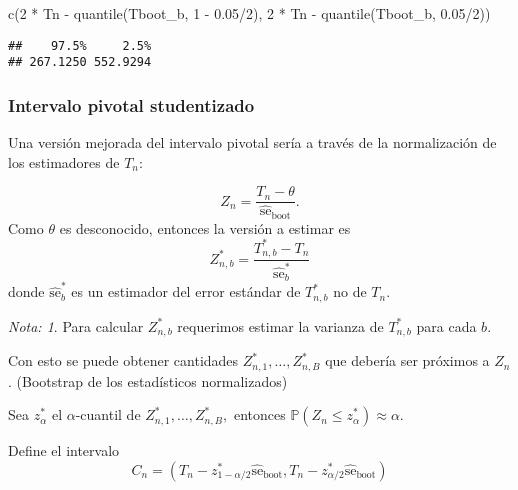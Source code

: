 \documentclass[
  12pt,
]{book}
\newenvironment{Shaded}{\begin{snugshade}}{\end{snugshade}}
\newcommand{\DecValTok}[1]{\textcolor[rgb]{0.00,0.00,0.81}{#1}}
\newcommand{\FloatTok}[1]{\textcolor[rgb]{0.00,0.00,0.81}{#1}}
\newcommand{\FunctionTok}[1]{\textcolor[rgb]{0.00,0.00,0.00}{#1}}
\newcommand{\NormalTok}[1]{#1}
\newcommand{\SpecialCharTok}[1]{\textcolor[rgb]{0.00,0.00,0.00}{#1}}
\theoremstyle{definition}
\theoremstyle{definition}
\theoremstyle{definition}
\theoremstyle{definition}
\theoremstyle{remark}
\newtheorem*{remark}{Nota: }
\begin{document}
\begin{Shaded}
\begin{Highlighting}[]
\FunctionTok{c}\NormalTok{(}\DecValTok{2} \SpecialCharTok{*}\NormalTok{ Tn }\SpecialCharTok{{-}} \FunctionTok{quantile}\NormalTok{(Tboot\_b, }\DecValTok{1} \SpecialCharTok{{-}} \FloatTok{0.05}\SpecialCharTok{/}\DecValTok{2}\NormalTok{), }\DecValTok{2} \SpecialCharTok{*}\NormalTok{ Tn }\SpecialCharTok{{-}}
    \FunctionTok{quantile}\NormalTok{(Tboot\_b, }\FloatTok{0.05}\SpecialCharTok{/}\DecValTok{2}\NormalTok{))}
\end{Highlighting}
\end{Shaded}

\begin{verbatim}
##    97.5%     2.5% 
## 267.1250 552.9294
\end{verbatim}

\hypertarget{intervalo-pivotal-studentizado}{%
\subsubsection{Intervalo pivotal studentizado}\label{intervalo-pivotal-studentizado}}

Una versión mejorada del intervalo pivotal sería a través de la normalización de los estimadores de \(T_n\):

\[
Z_{n}=\frac{T_{n}-\theta}{\widehat{\mathrm{se}}_{\mathrm{boot}}}.
\]
Como \(\theta\) es desconocido, entonces la versión a estimar es
\[
Z_{n, b}^{*}=\frac{T_{n, b}^{*}-T_{n}}{\widehat{\mathrm{se}}_{b}^{*}}
\]
donde \(\widehat{\mathrm{se}}_{b}^{*}\) es un estimador del error estándar de \(T_{n, b}^{*}\) no de \(T_{n}\).

\begin{remark}
Para calcular \(Z_{n, b}^{*}\) requerimos estimar la varianza de \(T_{n,b}^*\) para cada \(b\).
\end{remark}

Con esto se puede obtener cantidades \(Z_{n, 1}^{*}, \ldots, Z_{n, B}^{*}\) que debería ser próximos a \(Z_{n}\). (Bootstrap de los estadísticos normalizados)

Sea \(z_{\alpha}^{*}\) el \(\alpha\)-cuantil de \(Z_{n, 1}^{*}, \ldots, Z_{n, B}^{*},\) entonces \(\mathbb{P}\left(Z_{n} \leq z_{\alpha}^{*}\right) \approx \alpha\).

Define el intervalo
\begin{equation*}
C_{n}=\left(T_{n}-z_{1-\alpha / 2}^{*} \widehat{\mathrm{se}}_{\mathrm{boot}}, T_{n}-z_{\alpha / 2}^{*} \widehat{\mathrm{se}}_{\mathrm{boot}}\right)
\end{equation*}
\end{document}
